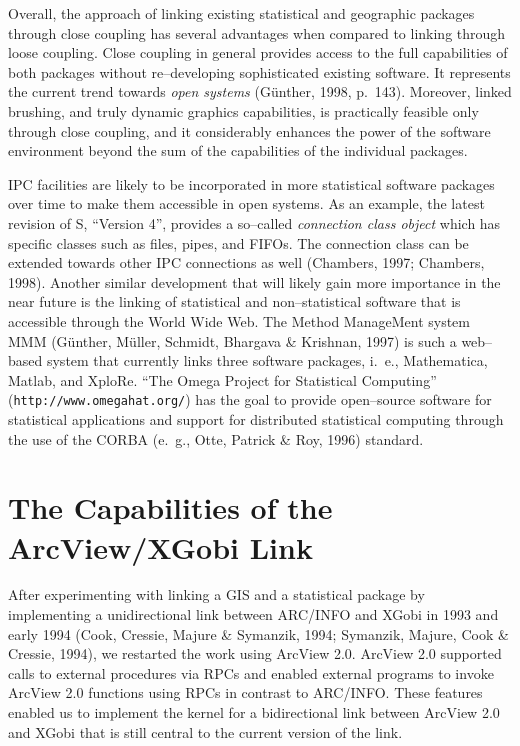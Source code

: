Overall, the approach of linking existing statistical and geographic
packages through close coupling has several advantages when compared
to linking through loose coupling.  Close coupling in general provides
access to the full capabilities of both packages without
re--developing sophisticated existing software. It represents the
current trend towards {\it open systems} (G{\"u}nther, 1998, p.\ 143).
Moreover, linked brushing, and truly dynamic graphics capabilities, is
practically feasible only through close coupling, and it considerably
enhances the power of the software environment beyond the sum of the
capabilities of the individual packages.

IPC facilities are likely to be incorporated in more
statistical software packages over time to make them accessible in
open systems. As an example, the latest revision of S, ``Version 4'',
provides a so--called {\it connection class object} which has specific
classes such as files, pipes, and FIFOs.  The connection class can be
extended towards other IPC connections as well (Chambers, 1997;
Chambers, 1998).
Another similar development that will likely gain more importance in
the near future is the linking of statistical and non--statistical
software that is accessible through the World Wide Web.  The Method
ManageMent system MMM (G\"unther, M\"uller, Schmidt, Bhargava \&
Krishnan, 1997) is such a web--based system that currently links three
software packages, i.~e., Mathematica, Matlab, and XploRe.
``The Omega Project for Statistical Computing''
(\verb|http://www.omegahat.org/|)
has the goal to
provide open--source software for statistical applications and support for
distributed statistical computing through the use of the 
CORBA (e.~g., Otte, Patrick \& Roy, 1996) standard. 



\section{The Capabilities of the ArcView/XGobi Link}

After experimenting with linking a GIS and a statistical
package by implementing a unidirectional link between ARC/INFO
and XGobi in 1993 and early 1994 (Cook, Cressie, Majure \& Symanzik, 1994;
Symanzik, Majure, Cook \& Cressie, 1994), we restarted the
work using ArcView 2.0. 
ArcView 2.0 supported calls to external procedures
via RPCs and enabled external programs to invoke
ArcView 2.0 functions using RPCs in contrast to ARC/INFO. 
These features enabled us
to implement the kernel for a bidirectional link between
ArcView 2.0 and XGobi that is still central to the current 
version of the link.

